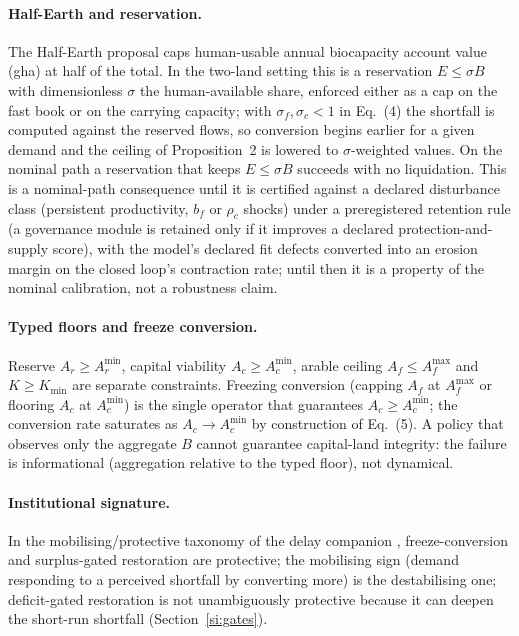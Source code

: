 \documentclass[11pt,a4paper]{article}
\newcommand{\Acmin}{A_c^{\min}}
\begin{document}
\paragraph{Half-Earth and reservation.} The Half-Earth proposal \citep{Wilson2016} caps human-usable annual biocapacity account value (gha) at half of the total. In the two-land setting this is a reservation $E\le\sigma B$ with dimensionless $\sigma$ the human-available share, enforced either as a cap on the fast book or on the carrying capacity; with $\sigma_f,\sigma_c<1$ in Eq.~(4) the shortfall is computed against the reserved flows, so conversion begins earlier for a given demand and the ceiling of Proposition~2 is lowered to $\sigma$-weighted values. On the nominal path a reservation that keeps $E\le\sigma B$ succeeds with no liquidation. This is a nominal-path consequence until it is certified against a declared disturbance class (persistent productivity, $b_f$ or $\rho_c$ shocks) under a preregistered retention rule (a governance module is retained only if it improves a declared protection-and-supply score), with the model's declared fit defects converted into an erosion margin on the closed loop's contraction rate; until then it is a property of the nominal calibration, not a robustness claim.

\paragraph{Typed floors and freeze conversion.} Reserve $A_r\ge A_r^{\min}$, capital viability $A_c\ge\Acmin$, arable ceiling $A_f\le A_f^{\max}$ and $K\ge K_{\min}$ are separate constraints. Freezing conversion (capping $A_f$ at $A_f^{\max}$ or flooring $A_c$ at $\Acmin$) is the single operator that guarantees $A_c\ge\Acmin$; the conversion rate saturates as $A_c\to\Acmin$ by construction of Eq.~(5). A policy that observes only the aggregate $B$ cannot guarantee capital-land integrity: the failure is informational (aggregation relative to the typed floor), not dynamical.

\paragraph{Institutional signature.} In the mobilising/protective taxonomy of the delay companion \citep{Abaee2026a}, freeze-conversion and surplus-gated restoration are protective; the mobilising sign (demand responding to a perceived shortfall by converting more) is the destabilising one; deficit-gated restoration is not unambiguously protective because it can deepen the short-run shortfall (Section~\ref{si:gates}).
\end{document}
